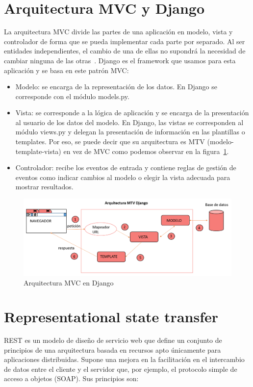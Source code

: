 \documentclass[a4paper, 12pt]{book}
\begin{document}
\section{Arquitectura MVC y Django}
La arquitectura MVC divide las partes de una aplicación en modelo, vista y controlador de forma que se pueda implementar cada parte por separado. Al ser entidades independientes, el cambio de una de ellas no supondrá la necesidad de cambiar ninguna de las otras~\cite{gonzalez2012patron}. Django es el framework que usamos para esta aplicación y se basa en este patrón MVC:

\begin{itemize}
    \item Modelo: se encarga de la representación de los datos. En Django se corresponde con el módulo models.py.
    \item Vista: se corresponde a la lógica de aplicación y se encarga de la presentación al usuario de los datos del modelo. En Django, las vistas se corresponden al módulo views.py y delegan la presentación de información en las plantillas o templates. Por eso, se puede decir que su arquitectura es MTV (modelo-template-vista) en vez de MVC como podemos observar en la figura~\ref{figura:MVC}.
    \item Controlador: recibe los eventos de entrada y contiene reglas de gestión de eventos como indicar cambios al modelo o elegir la vista adecuada para mostrar resultados. 
\end{itemize}

\begin{figure}[h]
        \centering
        \includegraphics[scale=0.42]{img/django_request.png}
        \caption{Arquitectura MVC en Django}
        \label{figura:MVC}
\end{figure}
\section{Representational state transfer}
REST es un modelo de diseño de servicio web que define un conjunto de principios de una arquitectura basada en recursos apto únicamente para aplicaciones distribuidas. Supone una mejora en la facilitación en el intercambio de datos entre el cliente y el servidor que, por ejemplo, el protocolo simple de acceso a objetos (SOAP). Sus principios son:
\end{document}
